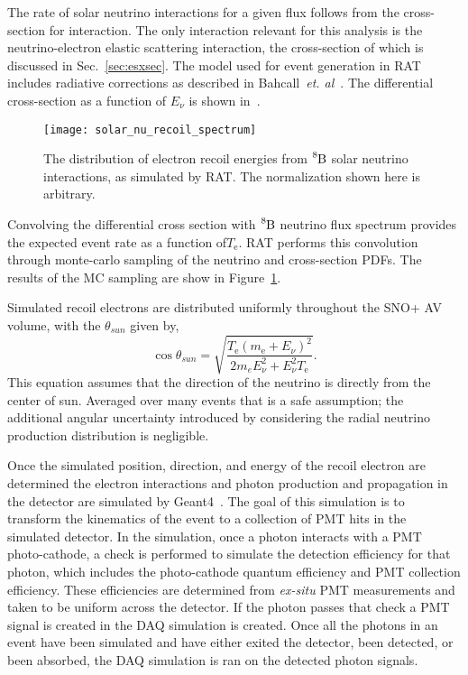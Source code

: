 The rate of solar neutrino interactions for a given flux follows from the cross-section for
interaction. The only interaction relevant for this analysis is the
neutrino-electron elastic scattering interaction, the cross-section of which
is discussed in Sec.~\ref{sec:esxsec}.
The model used for event generation in RAT includes radiative corrections as
described in Bahcall~\textit{et. al}~\citep{escrosssec}.
The differential cross-section as a function of $E_{\nu}$ is shown in~\citep{fig:diff_xsec}.

\begin{figure}[htbp]
  \centering
  \texttt{[image: solar\_nu\_recoil\_spectrum]}
  \caption[Solar Recoil Electron Spectrum]{
      The distribution of electron recoil energies from $\ce{^{8}B}$ solar neutrino
      interactions, as simulated by RAT. The normalization shown here is arbitrary.}
    \label{fig:recoil_spectrum}
\end{figure}

Convolving the differential cross section with $\ce{^{8}B}$ neutrino flux
spectrum provides the expected event rate as a function of$T_{\mathrm{e}}$. 
RAT performs this convolution through monte-carlo sampling of the neutrino
and cross-section PDFs.
The results of the MC sampling are show in Figure~\ref{fig:recoil_spectrum}.

Simulated recoil electrons are distributed uniformly throughout the SNO+ AV volume, with
the $\theta_{sun}$ given by,
\begin{equation}
  \cos\theta_{sun} = \sqrt{\dfrac{T_{\mathrm{e}}(m_{\mathrm{e}}+E_{\nu})^{2}}{2m_{e}E_{\nu}^{2} + E_{\nu}^{2}T_{\mathrm{e}}}}\text{.}
  \label{eqn:costheta_te}
\end{equation}
This equation assumes that the direction of the neutrino is directly from the center of sun.
Averaged over many events that is a safe assumption; the additional angular uncertainty
introduced by considering the radial neutrino production distribution is negligible.

Once the simulated position, direction, and energy of the recoil electron are determined  the
electron interactions and  photon production and propagation in the detector are simulated
by Geant4~\citep{geant4}.
The goal of this simulation is to transform the kinematics of the event to
a collection of PMT hits in the simulated detector.
In the simulation, once a photon interacts with a PMT photo-cathode, a check is performed
to simulate the detection efficiency for that photon, which includes the photo-cathode quantum efficiency and
PMT collection efficiency.
These efficiencies are determined from \textit{ex-situ} PMT measurements and
taken to be uniform across the detector. %
If the photon passes that check a PMT signal is created in the DAQ simulation is created.
Once all the photons in an event have been simulated and have either exited the detector,
been detected, or been absorbed, the DAQ simulation is ran on the detected photon signals.

